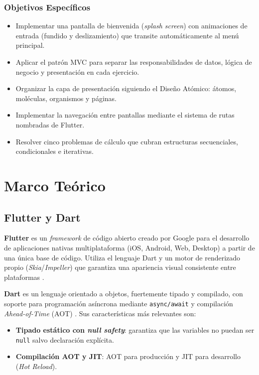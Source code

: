 \documentclass[12pt,a4paper]{article}
\begin{document}
\subsubsection{Objetivos Específicos}

\begin{itemize}
  \item Implementar una pantalla de bienvenida (\textit{splash screen}) con animaciones de entrada (fundido y deslizamiento) que transite automáticamente al menú principal.
  \item Aplicar el patrón MVC para separar las responsabilidades de datos, lógica de negocio y presentación en cada ejercicio.
  \item Organizar la capa de presentación siguiendo el Diseño Atómico: átomos, moléculas, organismos y páginas.
  \item Implementar la navegación entre pantallas mediante el sistema de rutas nombradas de Flutter.
  \item Resolver cinco problemas de cálculo que cubran estructuras secuenciales, condicionales e iterativas.
\end{itemize}

\section{Marco Teórico}

\subsection{Flutter y Dart}

\textbf{Flutter} es un \textit{framework} de código abierto creado por Google para el desarrollo de aplicaciones nativas multiplataforma (iOS, Android, Web, Desktop) a partir de una única base de código. Utiliza el lenguaje Dart y un motor de renderizado propio (\textit{Skia}/\textit{Impeller}) que garantiza una apariencia visual consistente entre plataformas \cite{flutter2024}.

\textbf{Dart} es un lenguaje orientado a objetos, fuertemente tipado y compilado, con soporte para programación asíncrona mediante \texttt{async/await} y compilación \textit{Ahead-of-Time} (AOT) \cite{dart2024}. Sus características más relevantes son:

\begin{itemize}
  \item \textbf{Tipado estático con \textit{null safety}}: garantiza que las variables no puedan ser \texttt{null} salvo declaración explícita.
  \item \textbf{Compilación AOT y JIT}: AOT para producción y JIT para desarrollo (\textit{Hot Reload}).
\end{itemize}
\end{document}
